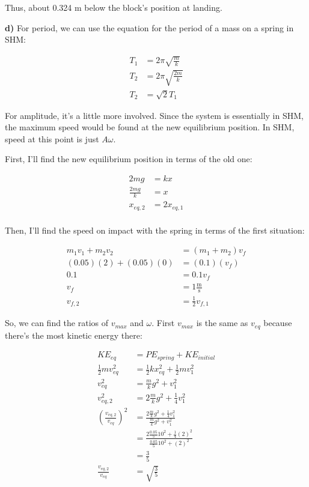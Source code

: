 \documentclass{article}
\begin{document}
Thus, about 0.324 m below the block's position at landing.

\vspace{1cm}

\large\textbf{d)} For period, we can use the equation for the period of a mass on a spring in SHM:

\begin{align*}
    T_1 &= 2\pi\sqrt{\frac{m}{k}} \\
    T_2 &= 2\pi\sqrt{\frac{2m}{k}} \\
    T_2 &= \sqrt{2}T_1
\end{align*}

For amplitude, it's a little more involved. Since the system is essentially in SHM, the maximum speed would be found at the new equilibrium position. In SHM, speed at this point is just $A\omega$.

First, I'll find the new equilibrium position in terms of the old one:

\begin{align*}
    2mg &= kx \\
    \frac{2mg}{k} &= x \\
    x_{eq,2} &= 2x_{eq,1} \\
\end{align*}

Then, I'll find the speed on impact with the spring in terms of the first situation:

\begin{align*}
    m_1v_1+m_2v_2 &= (m_1+m_2)v_f \\
    (0.05)(2) + (0.05)(0) &= (0.1)(v_f) \\
    0.1 &= 0.1v_f \\
    v_f &= 1 \frac{\text{m}}{\text{s}} \\
    v_{f,2} &= \frac{1}{2}v_{f,1} 
\end{align*}

So, we can find the ratios of $v_{max}$ and ${\omega}$. First $v_{max}$ is the same as $v_{eq}$ because there's the most kinetic energy there:

\begin{align*}
    KE_{eq} &= PE_{spring} + KE_{initial} \\
    \frac{1}{2}mv_{eq}^2 &= \frac{1}{2}kx_{eq}^2 + \frac{1}{2}mv_1^2 \\
    v_{eq}^2 &= \frac{m}{k} g^2 + v_1^2 \\
    v_{eq,2}^2 &= 2 \frac{m}{k} g^2 + \frac{1}{4}v_1^2 \\
    \left(\frac{v_{eq,2}}{v_{eq}}\right)^2 &= \frac{2\frac{m}{k}g^2 + \frac{1}{4}v_1^2}{\frac{m}{k}g^2 + v_1^2} \\
    &= \frac{2\frac{0.05}{5}10^2 + \frac{1}{4}(2)^2}{\frac{0.05}{5}10^2 + (2)^2} \\
    &= \frac{3}{5} \\
    \frac{v_{eq,2}}{v_{eq}} &= \sqrt{\frac{3}{5}}
\end{align*}
\end{document}
